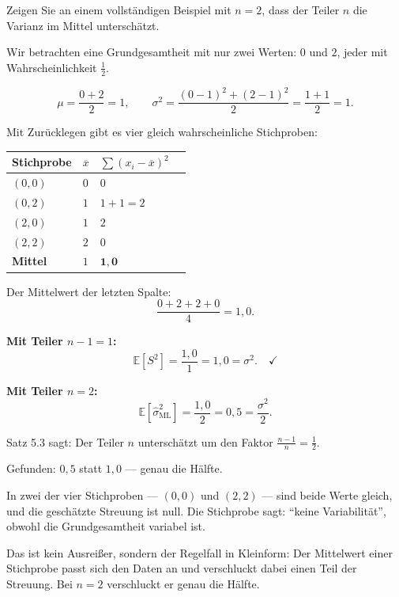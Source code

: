 \begin{aufgabe}
Zeigen Sie an einem vollständigen Beispiel mit $n=2$, dass der Teiler $n$ die Varianz im Mittel unterschätzt.

\loesung
{}
Wir betrachten eine Grundgesamtheit mit nur zwei Werten: $0$ und $2$, jeder mit Wahrscheinlichkeit $\frac12$.

\[ \mu = \frac{0+2}{2} = 1, \qquad \sigma^2 = \frac{(0-1)^2 + (2-1)^2}{2} = \frac{1+1}{2} = 1 . \]

Mit Zurücklegen gibt es vier gleich wahrscheinliche Stichproben:

\begin{center}
{\small
\renewcommand{\arraystretch}{1.42}
\begin{tabular}{@{}P{2.0cm}P{1.4cm}P{2.2cm}P{2.2cm}@{}}
\toprule
\textbf{Stichprobe} & $\overline x$ & $\sum(x_i-\overline x)^2$ & \\
\midrule
$(0,0)$ & $0$ & $0$ & \\
$(0,2)$ & $1$ & $1+1 = 2$ & \\
$(2,0)$ & $1$ & $2$ & \\
$(2,2)$ & $2$ & $0$ & \\
\midrule
\textbf{Mittel} & $1$ & $\mathbf{1{,}0}$ & \\
\bottomrule
\end{tabular}}
\end{center}

Der Mittelwert der letzten Spalte:
\[ \frac{0+2+2+0}{4} = 1{,}0 . \]

\textbf{Mit Teiler $n-1 = 1$:}
\[ \mathbb{E}[S^2] = \frac{1{,}0}{1} = 1{,}0 = \sigma^2 . \quad \checkmark \]

\textbf{Mit Teiler $n = 2$:}
\[ \mathbb{E}[\hat\sigma^2_{\mathrm{ML}}] = \frac{1{,}0}{2} = 0{,}5 = \frac{\sigma^2}{2} . \]

Satz 5.3 sagt: Der Teiler $n$ unterschätzt um den Faktor $\frac{n-1}{n} = \frac{1}{2}$.

Gefunden: $0{,}5$ statt $1{,}0$ --- genau die Hälfte. \checkmark

In zwei der vier Stichproben --- $(0,0)$ und $(2,2)$ --- sind beide Werte gleich, und die geschätzte Streuung ist null. Die Stichprobe sagt: \enquote{keine Variabilität}, obwohl die Grundgesamtheit variabel ist.

Das ist kein Ausreißer, sondern der Regelfall in Kleinform: Der Mittelwert einer Stichprobe passt sich den Daten an und verschluckt dabei einen Teil der Streuung. Bei $n=2$ verschluckt er genau die Hälfte.
\end{aufgabe}

